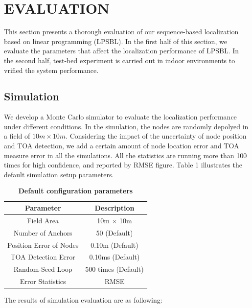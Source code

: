 \section{EVALUATION }
\label{section:results}
This section presents a thorough evaluation of our sequence-based localization based on linear programming (LPSBL).
In the first half of this section, we evaluate the parameters that affect the localization performance of LPSBL.
In the second half, test-bed experiment is carried out in indoor environments to vrified the system performance.

\subsection{Simulation}
We develop a Monte Carlo simulator to evaluate the localization performance under different conditions.
In the simulation, the nodes are randomly depolyed in a field of $10m \times 10m$. 
Considering the impact of the uncertainty of node position and TOA detection, we add a certain amount of node location error and TOA measure error in all the simulations.
All the statistics are running more than 100 times for high confidence, and reported by RMSE figure. 
Table 1 illustrates the default simulation setup parameters.
\begin{table} [!h] \normalsize
\caption {\textbf{Default configuration parameters}} %
\centering %
    \begin{tabular}{|c|c|}
        \hline
Parameter & Description \\
 \hline
Field Area & 10m $\times$ 10m \\
\hline
Number of Anchors & 50 (Default) \\
 \hline
Position Error of Nodes	 & 0.10m (Default) \\
 \hline
TOA Detection Error 	 & 0.10ms (Default) \\
 \hline
Random-Seed Loop	 & 500 times (Default) \\
 \hline
Error Statistics	 &  RMSE \\
        \hline
    \end{tabular}
\end{table}

The results of simulation evaluation are as following:

